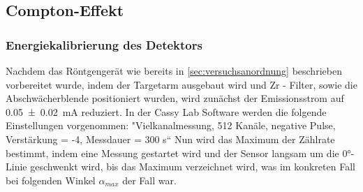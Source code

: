 \documentclass[12pt,english,ngerman]{scrartcl}
\begin{document}
\begin{figure}[H]
	\centering
	 \hfill
\end{figure}

\subsection{Compton-Effekt}

\subsubsection{Energiekalibrierung des Detektors}

Nachdem das Röntgengerät wie bereits in \autoref{sec:versuchsanordnung}
beschrieben vorbereitet wurde, indem der Targetarm ausgebaut wird und Zr -
Filter, sowie die Abschwächerblende positioniert wurden, wird zunächst der
Emissionsstrom auf \SI{0.05(2)}{\milli\ampere} reduziert. In der Cassy Lab
Software werden die folgende Einstellungen vorgenommen: "Vielkanalmessung, 512
Kanäle, negative Pulse, Verstärkung = -4, Messdauer = 300 s“ Nun wird das
Maximum der Zählrate bestimmt, indem eine Messung gestartet wird und der Sensor
langsam um die 0°-Linie geschwenkt wird, bis das Maximum verzeichnet wird, was
im konkreten Fall bei folgenden Winkel $\alpha_{max}$ der Fall war.
\end{document}
